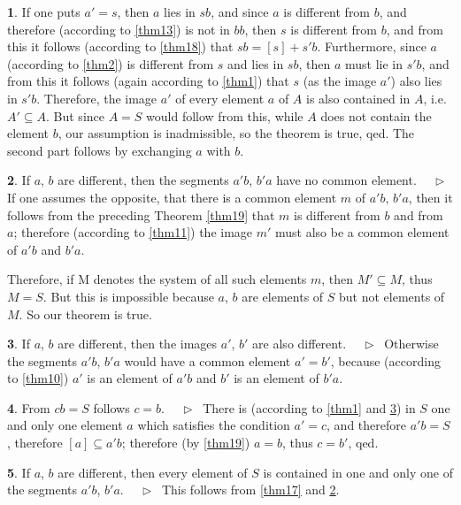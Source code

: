 \documentclass[leqno,hidelinks]{article}
\theoremstyle{definition}
\newtheorem{satz}{\protect\satzname}
\newcommand{\satzname}{}
\renewcommand{\satzname}{\hspace{-4pt}.\ Satz}%
\renewcommand{\satzname}{\hspace{-4pt}.\ Theorem}%
\newcommand\Beweis{\medskip \newline $ \phantom{'.'} \rhd \ $}%
\newcommand{\partof}{\subseteq}
\newcommand{\sref}[1]{\underline{\ref{#1}}}%
\begin{document}
\begin{paracol}{2}
\begin{satz}
If one puts $a'=s$, then $a$ lies in $sb$, and since $a$ is different from $b$,
and therefore (according to \sref{thm13}) is not in $bb$, then $s$ is different
from $b$, and from this it follows (according to \sref{thm18}) that $sb = [s] + s'b$.
Furthermore, since $a$ (according to \sref{thm2}) is different from $s$ and lies
in $sb$, then $a$ must lie in $s'b$, and from this it follows (again according to
\sref{thm1}) that $s$ (as the image $a'$) also lies in $s'b$.%
Therefore, the image $a'$ of every element $a$ of $A$ is also contained in $A$,
i.e. $A' \partof A$. But since $A=S$ would follow from this, while $A$ does not
contain the element $b$, our assumption is inadmissible, so the theorem is true,
qed.
The second part follows by exchanging $a$ with $b$.%
\end{satz}

\begin{satz}\label{thm20}
If $a$, $b$ are different, then the segments $a'b$, $b'a$ have no common element.
\Beweis
If one assumes the opposite, that there is a common element $m$ of $a'b$, $b'a$,
then it follows from the preceding Theorem \sref{thm19} that $m$ is different from
$b$ and from $a$; therefore (according to \sref{thm11}) the image $m'$ must also be
a common element of $a'b$ and $b'a$.%

Therefore, if M denotes the system of all such elements $m$, then $M' \partof M$,
thus $M=S$. But this is impossible because $a$, $b$ are elements of $S$ but not
elements of $M$. So our theorem is true.%
\ \\
\end{satz}

\begin{satz}\label{thm21}
If $a$, $b$ are different, then the images $a'$, $b'$ are also different.
\Beweis
Otherwise the segments $a'b$, $b'a$ would have a common element $a'=b'$, because
(according to \sref{thm10}) $a'$ is an element of $a'b$ and $b'$ is an element
of $b'a$.%
\end{satz}

\begin{satz}\label{thm22}
From $cb=S$ follows $c = b$.
\Beweis
There is (according to \sref{thm1} and \sref{thm21}) in $S$ one and only one element
$a$ which satisfies the condition $a'=c$, and therefore $a'b = S$, therefore
$[a] \partof a'b$; therefore (by \sref{thm19}) $a=b$, thus $c=b'$, qed.%
\end{satz}

\begin{satz}\label{thm23}
If $a$, $b$ are different, then every element of $S$ is contained in one and only
one of the segments $a'b$, $b'a$.
\Beweis
This follows from \sref{thm17} and \sref{thm20}.
\end{satz}


\end{paracol}
\end{document}
